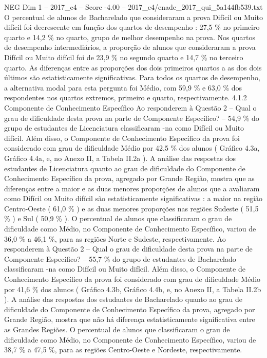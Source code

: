 \begin{textsample}{NEG Dim 1 – 2017\_c4 – Score -4.00 – 2017\_c4/enade\_2017\_qui\_5a144fb539.txt}
O percentual de alunos de Bacharelado que consideraram a prova Difícil ou Muito difícil foi decrescente em função dos quartos de desempenho : 27,5 \% no primeiro quarto e 14,2 \% no quarto, grupo de melhor desempenho na prova.
Nos quartos de desempenho intermediários, a proporção de alunos que consideraram a prova Difícil ou Muito difícil foi de 23,9 \% no segundo quarto e 14,7 \% no terceiro quarto.
As diferenças entre as proporções dos dois primeiros quartos a as dos dois últimos são estatisticamente significativas.
Para todos os quartos de desempenho, a alternativa modal para esta pergunta foi Médio, com 59,9 \% e 63,0 \% dos respondentes nos quartos extremos, primeiro e quarto, respectivamente. 4.1.2 Componente de Conhecimento Específico Ao responderem à Questão 2 – Qual o grau de dificuldade desta prova na parte de Componente Específico? – 54,9 \% do grupo de estudantes de Licenciatura classificaram -na como Difícil ou Muito difícil.
Além disso, o Componente de Conhecimento Específico da prova foi considerado com grau de dificuldade Médio por 42,5 \% dos alunos ( Gráfico 4.3a, Gráfico 4.4a, e, no Anexo II, a Tabela II.2a ).
A análise das respostas dos estudantes de Licenciatura quanto ao grau de dificuldade do Componente de Conhecimento Específico da prova, agregado por Grande Região, mostra que as diferenças entre a maior e as duas menores proporções de alunos que a avaliaram como Difícil ou Muito difícil são estatisticamente significativas : a maior na região Centro-Oeste ( 61,0 \% ) e as duas menores proporções nas regiões Sudeste ( 51,5 \% ) e Sul ( 50,9 \% ).
O percentual de alunos que classificaram o grau de dificuldade como Médio, no Componente de Conhecimento Específico, variou de 36,0 \% a 46,1 \%, para as regiões Norte e Sudeste, respectivamente.
Ao responderem à Questão 2 – Qual o grau de dificuldade desta prova na parte de Componente Específico? – 55,7 \% do grupo de estudantes de Bacharelado classificaram -na como Difícil ou Muito difícil.
Além disso, o Componente de Conhecimento Específico da prova foi considerado com grau de dificuldade Médio por 41,6 \% dos alunos ( Gráfico 4.3b, Gráfico 4.4b, e, no Anexo II, a Tabela II.2b ).
A análise das respostas dos estudantes de Bacharelado quanto ao grau de dificuldade do Componente de Conhecimento Específico da prova, agregado por Grande Região, mostra que não há diferença estatisticamente significativa entre as Grandes Regiões.
O percentual de alunos que classificaram o grau de dificuldade como Médio, no Componente de Conhecimento Específico, variou de 38,7 \% a 47,5 \%, para as regiões Centro-Oeste e Nordeste, respectivamente.

\end{textsample}
